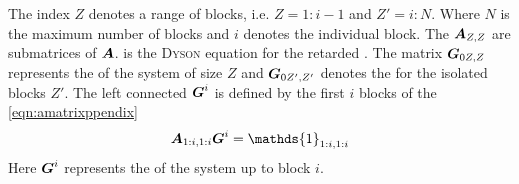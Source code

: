 The index $Z$ denotes a range of blocks, i.e. $Z = 1:i-1$ and $Z'=i:N$. Where $N$ is the maximum number of blocks and $i$ denotes the individual block. The $\boldsymbol{A}_{Z,Z}$ are submatrices of $\boldsymbol{A}$.  is the \textsc{Dyson} equation for the retarded \gfnc{}. The matrix $\boldsymbol{G}_{0 Z,Z}$ represents the \gfnc{} of the system of size $Z$ and $\boldsymbol{G}_{0 Z',Z'}$ denotes the \gfnc{} for the isolated blocks $Z'$.
The left connected \gfnc{} $\boldsymbol{G}^i$ is defined by the first $i$ blocks of the \cref{eqn:amatrixppendix} 
\begin{align}
\mat{A}_{1:i,1:i}\mat{G}^{i}=\mathds{1}_{1:i,1:i}
\end{align}
Here $\boldsymbol{G}^i$ represents the \gfnc{} of the system up to block $i$.
